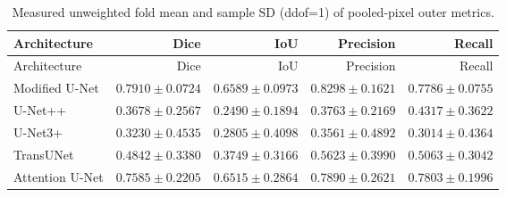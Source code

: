 \small
\begin{longtable}{lrrrr}
\caption{Measured unweighted fold mean and sample SD (ddof=1) of pooled-pixel outer metrics.}\\
\toprule
Architecture & Dice & IoU & Precision & Recall\\\midrule
\endfirsthead
\toprule
Architecture & Dice & IoU & Precision & Recall\\\midrule
\endhead
Modified U-Net & $0.7910\pm0.0724$ & $0.6589\pm0.0973$ & $0.8298\pm0.1621$ & $0.7786\pm0.0755$\\
U-Net++ & $0.3678\pm0.2567$ & $0.2490\pm0.1894$ & $0.3763\pm0.2169$ & $0.4317\pm0.3622$\\
U-Net3+ & $0.3230\pm0.4535$ & $0.2805\pm0.4098$ & $0.3561\pm0.4892$ & $0.3014\pm0.4364$\\
TransUNet & $0.4842\pm0.3380$ & $0.3749\pm0.3166$ & $0.5623\pm0.3990$ & $0.5063\pm0.3042$\\
Attention U-Net & $0.7585\pm0.2205$ & $0.6515\pm0.2864$ & $0.7890\pm0.2621$ & $0.7803\pm0.1996$\\
\bottomrule\end{longtable}\normalsize
